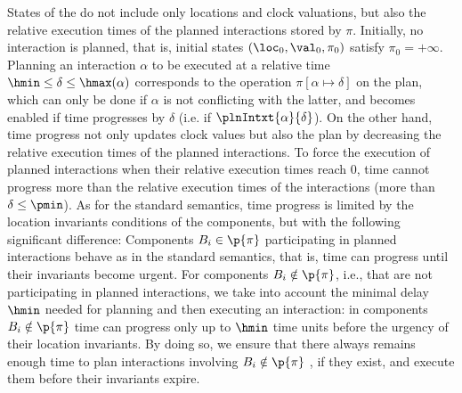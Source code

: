 States of the \lpsabrb do not include only locations and clock valuations, 
but also the relative execution times of the planned interactions stored by $\pi$.
Initially, no interaction is planned, that is, initial states $(\loc_0,\val_0,\pi_0)$ 
satisfy $\pi_0 = +\infty$.
Planning an interaction $\alpha$ to be executed at a relative time $\hmin\le\delta\le\hmax
(\alpha)$ corresponds to the operation $\pi [ \alpha\mapsto\delta ]$ on the plan, 
which can only be done if $\alpha$ is not conflicting with the latter, and becomes enabled if 
time progresses by $\delta$ (i.e. if $\plnIntxt{\alpha}{\delta}$).
On the other hand, time progress not only updates clock values but also the plan by 
decreasing the relative execution times of the planned interactions.
To force the execution of planned interactions when their relative execution times reach $0$, 
time cannot progress more than the relative execution times of the interactions 
(more than $\delta \le \pmin$).
As for the standard semantics, time progress is limited by the location invariants conditions 
of the components, but with the following significant difference:
Components $B_i \in \p{\pi}$ participating in planned interactions behave as in the standard 
semantics, that is, time can progress until their invariants become urgent.
For components $B_i \notin \p{\pi}$, i.e., that are not participating in planned interactions, 
we take into account the minimal delay $\hmin$ needed for planning and then executing an 
interaction: in components $B_i \notin \p{\pi}$ time can progress only up to $\hmin$ time 
units before the urgency of their location invariants.
By doing so, we ensure that there always remains enough time to plan interactions involving 
$B_i \notin \p{\pi}$ , if they exist, and execute them before their invariants 
expire.
 
